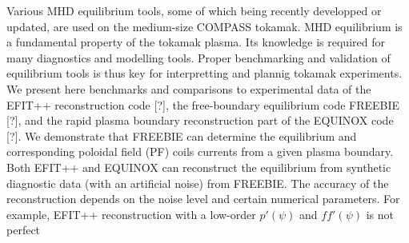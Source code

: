 Various MHD equilibrium tools, some of which being recently developped or updated, are used on the medium-size COMPASS tokamak. MHD equilibrium is a fundamental property of the tokamak plasma. Its knowledge is required for many diagnostics and modelling tools. Proper benchmarking and validation of equilibrium tools is thus key for interpretting and plannig tokamak experiments. We present here benchmarks and comparisons to experimental data of the EFIT++ reconstruction code [?], the free-boundary equilibrium code FREEBIE [?], and the rapid plasma boundary reconstruction part of the EQUINOX code [?]. We demonstrate that FREEBIE can determine the equilibrium and corresponding poloidal field (PF) coils currents from a given plasma boundary. Both EFIT++ and EQUINOX can reconstruct the equilibrium from synthetic diagnostic data (with an artificial noise) from FREEBIE. The accuracy of the reconstruction depends on the noise level and certain numerical parameters. For example, EFIT++ reconstruction with a low-order $p'\left(\psi\right)$ and $ff'\left(\psi\right)$ is not perfect